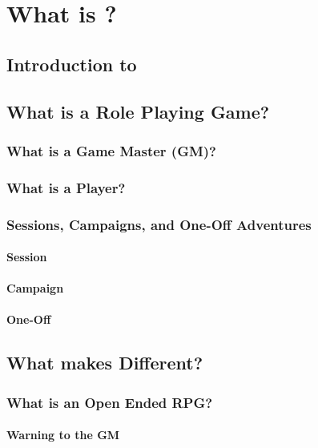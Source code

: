 
\part{What is {\slshape\gametitle}?}

\chapter{Introduction to {\slshape\gametitle}}

\chapter{What is a Role Playing Game?}

\section{What is a Game Master (GM)?}

\section{What is a Player?}

\section{Sessions, Campaigns, and One-Off Adventures}

\subsection{Session}

\subsection{Campaign}

\subsection{One-Off}

\chapter{What makes \gametitle Different?}

\section{What is an Open Ended RPG?}

\subsection{Warning to the GM}
